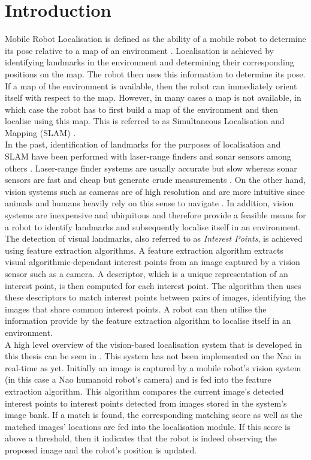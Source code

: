 \chapter{Introduction}
\label{sec:introduction}
Mobile Robot Localisation is defined as the ability of a mobile robot to determine its pose relative to a map of an environment \citep{Thrun2002}. Localisation is achieved by identifying landmarks in the environment and determining their corresponding positions on the map. The robot then uses this information to determine its pose. If a map of the environment is available, then the robot can immediately orient itself with respect to the map. However, in many cases a map is not available, in which case the robot has to first build a map of the environment and then localise using this map. This is referred to as Simultaneous Localisation and Mapping (SLAM) \citep{Durrant2006, Bailey2006b}.\\

In the past, identification of landmarks for the purposes of localisation and SLAM have been performed with laser-range finders and sonar sensors among others \citep{Davison2007}. Laser-range finder systems are usually accurate but slow whereas sonar sensors are fast and cheap but generate crude measurements \citep{Se2002}. On the other hand, vision systems such as cameras are of high resolution and are more intuitive since animals and humans heavily rely on this sense to navigate \citep{Davison2007}. In addition, vision systems are inexpensive and ubiquitous and therefore provide a feasible means for a robot to identify landmarks and subsequently localise itself in an environment.\\

The detection of visual landmarks, also referred to as \textit{Interest Points}, is achieved using feature extraction algorithms. A feature extraction algorithm extracts visual algorithmic-dependant interest points from an image captured by a vision sensor such as a camera. A descriptor, which is a unique representation of an interest point, is then computed for each interest point. The algorithm then uses these descriptors to match interest points between pairs of images, identifying the images that share common interest points. A robot can then utilise the information provide by the feature extraction algorithm to localise itself in an environment. \\

A high level overview of the vision-based localisation system that is developed in this thesis can be seen in . This system has not been implemented on the Nao in real-time as yet. Initially an image is captured by a mobile robot's vision system (in this case a Nao humanoid robot's camera) and is fed into the feature extraction algorithm. This algorithm compares the current image's detected interest points to interest points detected from images stored in the system's image bank. If a match is found, the corresponding matching score as well as the matched images' locations are fed into the localisation module. If this score is above a threshold, then it indicates that the robot is indeed observing the proposed image and the robot's position is updated.\\

